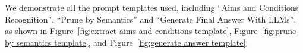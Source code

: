 We demonstrate all the prompt templates used, including ``Aims and Conditions Recognition'', ``Prune by Semantics'' and ``Generate Final Answer With LLMs'', as shown in Figure~\ref{fig:extract aims and conditions template}, Figure~\ref{fig:prune by semantics template}, and Figure~\ref{fig:generate answer template}.
